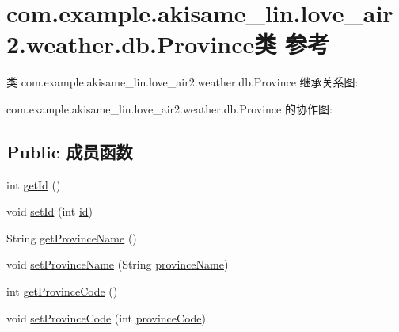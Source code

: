 \hypertarget{classcom_1_1example_1_1akisame__lin_1_1love__air2_1_1weather_1_1db_1_1_province}{}\section{com.\+example.\+akisame\+\_\+lin.\+love\+\_\+air2.\+weather.\+db.\+Province类 参考}
\label{classcom_1_1example_1_1akisame__lin_1_1love__air2_1_1weather_1_1db_1_1_province}


类 com.\+example.\+akisame\+\_\+lin.\+love\+\_\+air2.\+weather.\+db.\+Province 继承关系图\+:


com.\+example.\+akisame\+\_\+lin.\+love\+\_\+air2.\+weather.\+db.\+Province 的协作图\+:
\subsection*{Public 成员函数}
\begin{DoxyCompactItemize}
\item 
int \mbox{\hyperlink{classcom_1_1example_1_1akisame__lin_1_1love__air2_1_1weather_1_1db_1_1_province_a1e64c3a386d719364532b35c5ba27c59}{get\+Id}} ()
\item 
void \mbox{\hyperlink{classcom_1_1example_1_1akisame__lin_1_1love__air2_1_1weather_1_1db_1_1_province_a36ce96ba9a48a86ef631a58f3efa3f44}{set\+Id}} (int \mbox{\hyperlink{classcom_1_1example_1_1akisame__lin_1_1love__air2_1_1weather_1_1db_1_1_province_ad16666d20e1163aadbdf4041b6f71e3c}{id}})
\item 
String \mbox{\hyperlink{classcom_1_1example_1_1akisame__lin_1_1love__air2_1_1weather_1_1db_1_1_province_ac49c7058428dc93b6121aa6412b38da7}{get\+Province\+Name}} ()
\item 
void \mbox{\hyperlink{classcom_1_1example_1_1akisame__lin_1_1love__air2_1_1weather_1_1db_1_1_province_a737223b02b46c0812a42fdf037c8f5a4}{set\+Province\+Name}} (String \mbox{\hyperlink{classcom_1_1example_1_1akisame__lin_1_1love__air2_1_1weather_1_1db_1_1_province_a8c2fcb1e064fe9f3989413b03b2532be}{province\+Name}})
\item 
int \mbox{\hyperlink{classcom_1_1example_1_1akisame__lin_1_1love__air2_1_1weather_1_1db_1_1_province_ad37db1953f9c074fa4009c30bd7892d4}{get\+Province\+Code}} ()
\item 
void \mbox{\hyperlink{classcom_1_1example_1_1akisame__lin_1_1love__air2_1_1weather_1_1db_1_1_province_a9622edef2fe77d302ad9d95dc2042c02}{set\+Province\+Code}} (int \mbox{\hyperlink{classcom_1_1example_1_1akisame__lin_1_1love__air2_1_1weather_1_1db_1_1_province_a82eddd512b0b5c341236f05073a3a045}{province\+Code}})
\end{DoxyCompactItemize}
